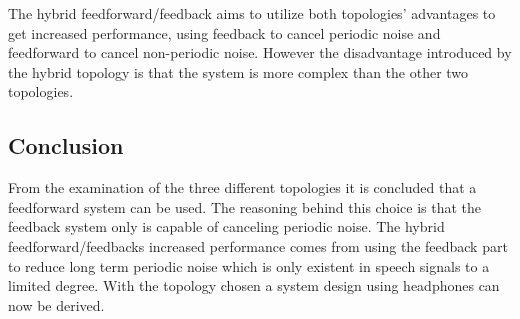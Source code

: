 The hybrid feedforward/feedback aims to utilize both topologies' advantages to get increased performance, using feedback to cancel periodic noise and feedforward to cancel non-periodic noise. However the disadvantage introduced by the hybrid topology is that the system is more complex than the other two topologies.   

\subsection{Conclusion}
From the examination of the three different topologies it is concluded that a feedforward system can be used. The reasoning behind this choice is that the feedback system only is capable of canceling periodic noise. The hybrid feedforward/feedbacks increased performance comes from using the feedback part to reduce long term periodic noise which is only existent in speech signals to a limited degree. With the topology chosen a system design using headphones can now be derived. 